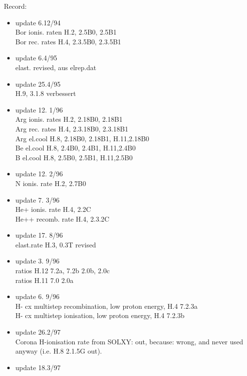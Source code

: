 Record:
\begin{itemize}
\item update  6.12/94 \\
   Bor ionis. raten H.2, 2.5B0, 2.5B1 \\
                           Bor rec.   rates H.4, 2.3.5B0, 2.3.5B1 \\
 \item update  6.4/95 \\
  elast. revised, aus elrep.dat \\
 \item update  25.4/95 \\
  H.9, 3.1.8 verbessert   \\
 \item update 12. 1/96 \\
   Arg ionis. rates H.2, 2.18B0, 2.18B1   \\
   Arg rec.   rates H.4, 2.3.18B0, 2.3.18B1 \\
   Arg el.cool      H.8, 2.18B0, 2.18B1, H.11,2.18B0\\
   Be  el.cool      H.8, 2.4B0, 2.4B1, H.11,2.4B0\\
   B   el.cool      H.8, 2.5B0, 2.5B1, H.11,2.5B0\\
 \item update 12. 2/96 \\
   N ionis. rate H.2, 2.7B0 \\
 \item update  7. 3/96 \\
   He+ ionis. rate H.4, 2.2C \\
   He++ recomb. rate H.4, 2.3.2C \\
 \item update  17. 8/96 \\
   elast.rate H.3, 0.3T revised
 \item update   3. 9/96 \\
   ratios H.12 7.2a, 7.2b 2.0b, 2.0c\\
   ratios H.11 7.0 2.0a
 \item update   6. 9/96 \\
   H- cx multistep recombination, low proton energy, H.4  7.2.3a\\
   H- cx multistep ionisation, low proton energy, H.4  7.2.3b
 \item update   26.2/97 \\
   Corona H-ionisation rate from SOLXY: out, because:
   wrong, and never used anyway
(i.e. H.8 2.1.5G out).
 \item update   18.3/97 \\

\end{itemize}
